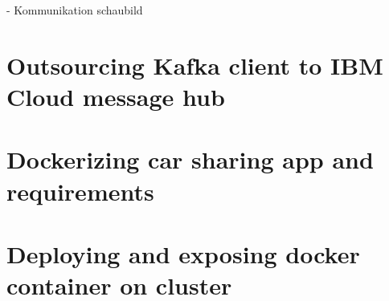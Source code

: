 

- Kommunikation schaubild

\section{Outsourcing Kafka client to IBM Cloud message hub}

\section{Dockerizing car sharing app and requirements}

\section{Deploying and exposing docker container on cluster}

